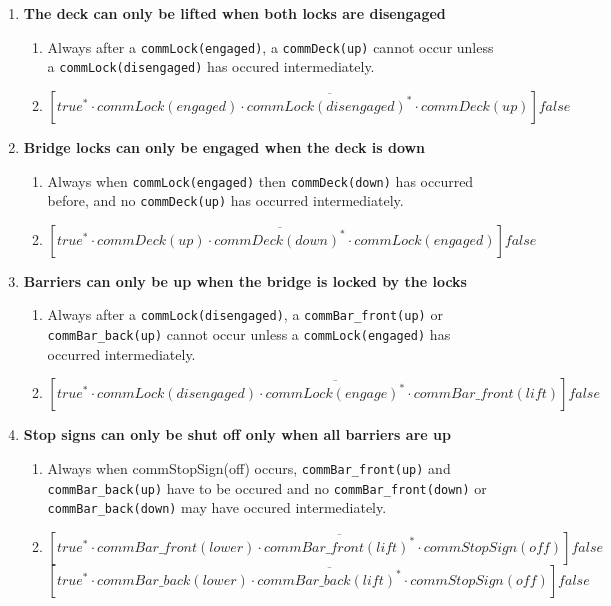 \begin{enumerate}
	\item	\textbf{The deck can only be lifted when both locks are disengaged}
	\begin{enumerate}
		\item Always after a \texttt{commLock(engaged)}, a \texttt{commDeck(up)} cannot occur unless a \texttt{commLock(disengaged)} has occured intermediately.
		\item $[true^* \cdot commLock(engaged)\cdot \overline{commLock(disengaged)^{*}} \cdot commDeck(up)]false$\\
	\end{enumerate}

	\item \textbf{Bridge locks can only be engaged when the deck is down}
	\begin{enumerate}
		\item Always when \texttt{commLock(engaged)} then \texttt{commDeck(down)} has occurred before, and no \texttt{commDeck(up)} has occurred intermediately.
		\item $[true^* \cdot commDeck(up) \cdot \overline{commDeck(down)^{*}} \cdot commLock(engaged)]false$\\
	\end{enumerate}

	\item \textbf{Barriers can only be up when the bridge is locked by the locks}
	\begin{enumerate}
		\item Always after a \texttt{commLock(disengaged)}, a \texttt{commBar\_front(up)} or \texttt{commBar\_back(up)} cannot occur unless a \texttt{commLock(engaged)} has occurred intermediately.
		\item $[true^* \cdot commLock(disengaged)\cdot \overline{commLock(engage)^{*}} \cdot commBar\_front(lift)]false$\\
	\end{enumerate}

	\item \textbf{Stop signs can only be shut off only when all barriers are up}
	\begin{enumerate}
		\item Always when commStopSign(off) occurs, \texttt{commBar\_front(up)} and \texttt{commBar\_back(up)} have to be occured and no \texttt{commBar\_front(down)} or \texttt{commBar\_back(down)} may have occured intermediately.
		\item $[true^* \cdot commBar\_front(lower) \cdot \overline{commBar\_front(lift)^{*}} \cdot commStopSign(off)]false$
					$[true^* \cdot commBar\_back(lower) \cdot \overline{commBar\_back(lift)^{*}} \cdot commStopSign(off)]false$
	\end{enumerate}


\end{enumerate}
